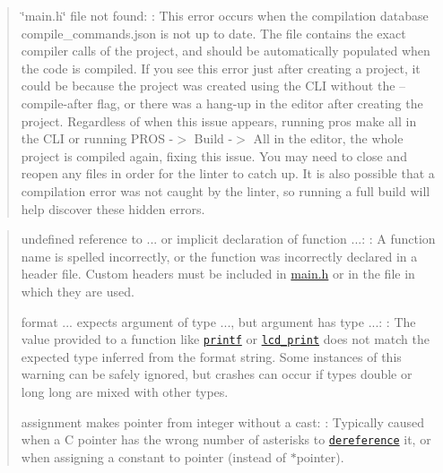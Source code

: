 \begin{quote}

\begin{DoxyItemize}
\item {\ttfamily \char`\"{}main.\+h\char`\"{} file not found}\+: \+: This error occurs when the compilation database {\ttfamily compile\+\_\+commands.\+json} is not up to date. The file contains the exact compiler calls of the project, and should be automatically populated when the code is compiled. If you see this error just after creating a project, it could be because the project was created using the C\+LI without the {\ttfamily –compile-\/after} flag, or there was a hang-\/up in the editor after creating the project. Regardless of when this issue appears, running {\ttfamily pros make all} in the C\+LI or running {\ttfamily P\+R\+OS -\/$>$ Build -\/$>$ All} in the editor, the whole project is compiled again, fixing this issue. You may need to close and reopen any files in order for the linter to catch up. It is also possible that a compilation error was not caught by the linter, so running a full build will help discover these hidden errors.
\end{DoxyItemize}

\end{quote}


\begin{quote}

\begin{DoxyItemize}
\item {\ttfamily undefined reference to ...} or {\ttfamily implicit declaration of function ...}\+: \+: A function name is spelled incorrectly, or the function was incorrectly declared in a header file. Custom headers must be included in {\ttfamily \hyperlink{main_8h}{main.\+h}} or in the file in which they are used.
\item {\ttfamily format ... expects argument of type ..., but argument has type ...}\+: \+: The value provided to a function like \href{http://www.cplusplus.com/reference/cstdio/printf/}{\tt printf} or \href{../../api/c/llemu.html#lcd-print}{\tt lcd\+\_\+print} does not match the expected type inferred from the format string. Some instances of this warning can be safely ignored, but crashes can occur if types {\ttfamily double} or {\ttfamily long long} are mixed with other types.
\item {\ttfamily assignment makes pointer from integer without a cast}\+: \+: Typically caused when a C pointer has the wrong number of asterisks to \href{http://stackoverflow.com/a/4955297/3681958}{\tt dereference} it, or when assigning a constant to {\ttfamily pointer} (instead of {\ttfamily $\ast$pointer}).
\end{DoxyItemize}

\end{quote}


